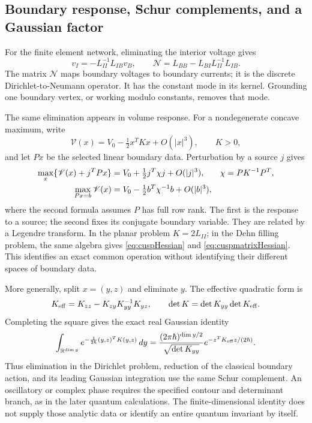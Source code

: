 \documentclass[11pt,a4paper]{article}
\numberwithin{equation}{section}
\theoremstyle{definition}
\theoremstyle{remark}
\begin{document}
\subsection{Boundary response, Schur complements, and a Gaussian factor}

For the finite element network, eliminating the interior voltage gives
\begin{equation}
 v_I=-L_{II}^{-1}L_{IB}v_B,\qquad
 \mathcal N=L_{BB}-L_{BI}L_{II}^{-1}L_{IB}.
 \label{eq:ipolyDtN}
\end{equation}
The matrix $\mathcal N$ maps boundary voltages to boundary currents;
it is the discrete Dirichlet-to-Neumann operator. It has the constant
mode in its kernel. Grounding one boundary vertex, or working modulo
constants, removes that mode.

The same elimination appears in volume response. For a nondegenerate
concave maximum, write
\[
 \mathscr V(x)=V_0-\tfrac12x^TKx+O(|x|^3),\qquad K>0,
\]
and let $Px$ be the selected linear boundary data. Perturbation by a
source $j$ gives
\begin{align}
 \max_x\{\mathscr V(x)+j^TPx\}
    &=V_0+\tfrac12j^T\chi j+O(|j|^3),
 &\chi&=PK^{-1}P^T,\notag\\
 \max_{Px=b}\mathscr V(x)
    &=V_0-\tfrac12b^T\chi^{-1}b+O(|b|^3),
 \label{eq:ipolyBoundaryResponse}
\end{align}
where the second formula assumes $P$ has full row rank. The first is
the response to a source; the second fixes its conjugate boundary
variable. They are related by a Legendre transform. In the planar
problem $K=2L_{II}$; in the Dehn filling problem, the same algebra gives
\eqref{eq:cuspHessian} and \eqref{eq:cuspmatrixHessian}. This identifies
an exact common operation without identifying their different spaces
of boundary data.

More generally, split $x=(y,z)$ and eliminate $y$. The effective
quadratic form is
\begin{equation}
 K_{\rm eff}=K_{zz}-K_{zy}K_{yy}^{-1}K_{yz},\qquad
 \det K=\det K_{yy}\det K_{\rm eff}.
 \label{eq:ipolySchur}
\end{equation}
Completing the square gives the exact real Gaussian identity
\begin{equation}
 \int_{\mathbb R^{\dim y}}
 e^{-\frac1{2\hbar}(y,z)^TK(y,z)}\,dy
 =\frac{(2\pi\hbar)^{\dim y/2}}{\sqrt{\det K_{yy}}}
       e^{-z^TK_{\rm eff}z/(2\hbar)}.
 \label{eq:ipolyGaussian}
\end{equation}
Thus elimination in the Dirichlet problem, reduction of the classical
boundary action, and its leading Gaussian integration use the same
Schur complement. An oscillatory or complex phase requires the specified
contour and determinant branch, as in the later quantum calculations.
The finite-dimensional identity does not supply those analytic data
or identify an entire quantum invariant by itself.
\end{document}
